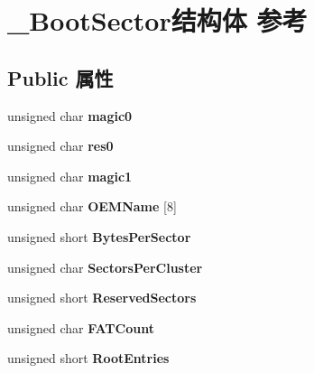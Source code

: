 \hypertarget{struct___boot_sector}{}\section{\+\_\+\+Boot\+Sector结构体 参考}
\label{struct___boot_sector}
\subsection*{Public 属性}
\begin{DoxyCompactItemize}
\item 
\mbox{\label{struct___boot_sector_ae3f10f6a1ebb04a8a17183ebce493cf2}} 
unsigned char {\bfseries magic0}
\item 
\mbox{\label{struct___boot_sector_a6fa490ea588ccbcd9c8375fb354604fd}} 
unsigned char {\bfseries res0}
\item 
\mbox{\label{struct___boot_sector_a9b5feda068502b2a34d5123b3f500791}} 
unsigned char {\bfseries magic1}
\item 
\mbox{\label{struct___boot_sector_a07aa4f3c3617f1932cdde2027a53afe1}} 
unsigned char {\bfseries O\+E\+M\+Name} \mbox{[}8\mbox{]}
\item 
\mbox{\label{struct___boot_sector_a78b2e3c0878f2ccb9700d6d62efcc7d6}} 
unsigned short {\bfseries Bytes\+Per\+Sector}
\item 
\mbox{\label{struct___boot_sector_ab63de16732b64ec2e2cdca09fb54b7e8}} 
unsigned char {\bfseries Sectors\+Per\+Cluster}
\item 
\mbox{\label{struct___boot_sector_a3dbcda128528513fabc1031fe6923d52}} 
unsigned short {\bfseries Reserved\+Sectors}
\item 
\mbox{\label{struct___boot_sector_a8b98439c86e592d213b9b8cf188dc589}} 
unsigned char {\bfseries F\+A\+T\+Count}
\item 
\mbox{\label{struct___boot_sector_ac613ccc21693f64904f1fc3ace4eb714}} 
unsigned short {\bfseries Root\+Entries}

\end{DoxyCompactItemize}

